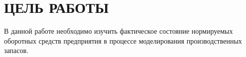 \section{ЦЕЛЬ РАБОТЫ}

В данной работе необходимо изучить фактическое состояние 
нормируемых оборотных средств предприятия в процессе моделирования
производственных запасов.

\newpage

